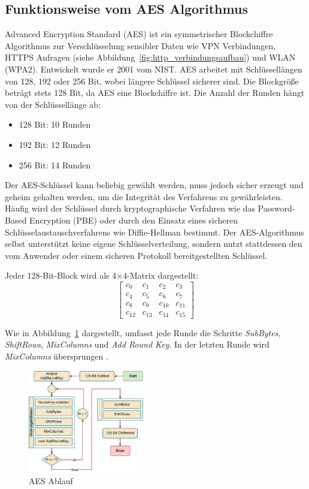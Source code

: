 \subsection{Funktionsweise vom AES Algorithmus}
\label{sec:aes}
\setlength{\parindent}{0pt}

Advanced Encryption Standard (AES) ist ein symmetrischer Blockchiffre Algorithmus zur 
Verschlüsselung sensibler Daten wie VPN Verbindungen, HTTPS Anfragen 
(siehe Abbildung~\ref{fig:http_verbindungsaufbau}) und WLAN (WPA2). 
Entwickelt wurde er 2001 vom NIST. AES arbeitet mit Schlüssellängen von 128, 192 oder 256 Bit, 
wobei längere Schlüssel sicherer sind. Die Blockgröße beträgt stets 128 Bit, da AES eine Blockchiffre 
ist. Die Anzahl der Runden hängt von der Schlüssellänge ab: 
\begin{itemize}
    \item 128 Bit: 10 Runden
    \item 192 Bit: 12 Runden
    \item 256 Bit: 14 Runden
\end{itemize}
Der AES-Schlüssel kann beliebig gewählt werden, muss jedoch sicher erzeugt und geheim gehalten werden, um 
die Integrität des Verfahrens zu gewährleisten. Häufig wird der Schlüssel durch kryptographische Verfahren 
wie das Password-Based Encryption (PBE) oder durch den Einsatz eines sicheren Schlüsselaustauschverfahrens 
wie Diffie-Hellman bestimmt. Der AES-Algorithmus selbst unterstützt keine eigene Schlüsselverteilung, sondern 
nutzt stattdessen den vom Anwender oder einem sicheren Protokoll bereitgestellten Schlüssel.


Jeder 128-Bit-Block wird als 4$\times$4-Matrix dargestellt:
\[
\begin{bmatrix}
c_0  & c_1  & c_2  & c_3 \\
c_4  & c_5  & c_6  & c_7 \\
c_8  & c_9  & c_{10} & c_{11} \\
c_{12}  & c_{13}  & c_{14} & c_{15}
\end{bmatrix}
\]

Wie in Abbildung~\ref{fig:qualen_AES} dargestellt, umfasst jede Runde die Schritte \textit{SubBytes}, \textit{ShiftRows}, \textit{MixColumns} und \textit{Add Round Key}. 
In der letzten Runde wird \textit{MixColumns} über\-sprungen \cite{AES_Algorithmus_2} \cite{AES_Algorithmus_3} \cite{AES_Algorithmus} \cite{Blockchiffre}.

\begin{figure}[H]
	\centering
	\includegraphics[width=0.45\textwidth]{sections/matheo/final.drawio.png}
	\caption{AES Ablauf}
	\label{fig:qualen_AES}
\end{figure}



